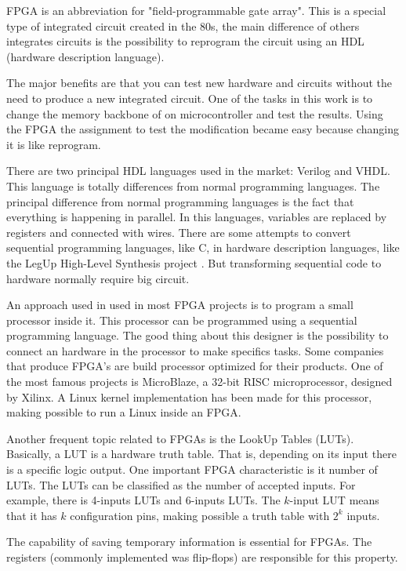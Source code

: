 FPGA is an abbreviation for "field-programmable gate array". This is a special type of integrated circuit created in the 80s, the main difference of others integrates circuits is the possibility to reprogram the circuit using an HDL (hardware description language).

The major benefits are that you can test new hardware and circuits without the need to produce a new integrated circuit. One of the tasks in this work is to change the memory backbone of on microcontroller and test the results. Using the FPGA  the assignment to test the modification became easy because changing it is like reprogram.

There are two principal HDL languages used in the market: Verilog and VHDL. This language is totally differences from normal programming languages.  The principal difference from normal programming languages is the fact that everything is happening in parallel. In this languages, variables are replaced by registers and connected with wires. There are some attempts to convert sequential programming languages, like C, in hardware description languages, like the LegUp High-Level Synthesis project \cite{legup}. But transforming sequential code to hardware normally require big circuit. 

An approach used in used in most FPGA projects is to program a small processor inside it. This processor can be programmed using a sequential programming language. The good thing about this designer is the possibility to connect an hardware in the processor to make specifics tasks. Some companies that produce FPGA's are build processor optimized for their products. One of the most famous projects is MicroBlaze, a 32-bit RISC microprocessor, designed by Xilinx.  A Linux kernel implementation has been made for this processor, making possible to run a Linux inside an FPGA.

Another frequent topic related to FPGAs is the  LookUp Tables (LUTs). Basically, a LUT is a hardware truth table. That is, depending on its input there is a specific logic output. One important FPGA characteristic is it number of LUTs. The LUTs can be classified as the number of accepted inputs. For example, there is 4-inputs LUTs and 6-inputs LUTs. The $k$-input LUT means that it has $k$ configuration pins, making possible a truth table with $2^k$ inputs. 

The capability of saving temporary information is essential for FPGAs. The registers (commonly implemented was flip-flops) are responsible for this property. 

